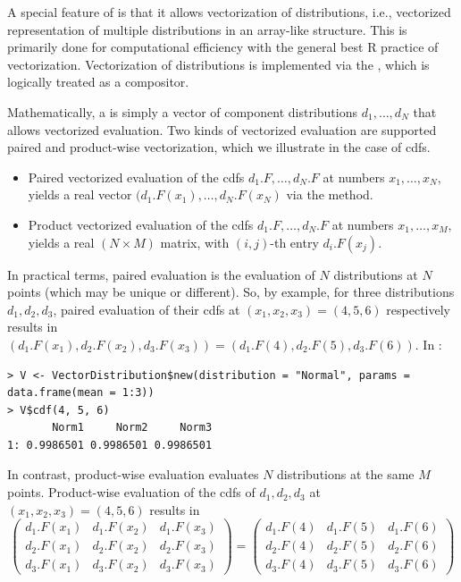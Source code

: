 A special feature of  is that it allows vectorization of distributions,  i.e., vectorized representation of multiple distributions in an array-like structure. This is primarily done for computational efficiency with the general best R practice of vectorization. Vectorization of  distributions is implemented via the , which is logically treated as a compositor.

Mathematically, a  is simply a vector of component distributions $d_1,\dots, d_N$ that allows vectorized evaluation. Two kinds of vectorized evaluation are supported paired and product-wise vectorization, which we illustrate in the case of cdfs.
\begin{itemize}
\itemsep-0.2em
\item Paired vectorized evaluation of the cdfs $d_1.F,\dots, d_N.F$ at numbers $x_1,\dots, x_N,$ yields a real vector $(d_1.F(x_1),\dots, d_N.F(x_N)$ via the  method.
\item Product vectorized evaluation of the cdfs $d_1.F,\dots, d_N.F$ at numbers $x_1,\dots, x_M,$ yields a real $(N\times M)$ matrix, with $(i,j)$-th entry $d_i.F(x_j)$.
\end{itemize}

In practical terms, paired evaluation is the evaluation of $N$ distributions at $N$ points (which may be unique or different). So, by example, for three distributions $d_1,d_2,d_3$, paired evaluation of their cdfs at $(x_1, x_2, x_3) = (4,5,6)$ respectively results in $(d_1.F(x_1), d_2.F(x_2), d_3.F(x_3)) = (d_1.F(4), d_2.F(5), d_3.F(6))$. In :
\begin{verbatim}
> V <- VectorDistribution$new(distribution = "Normal", params = data.frame(mean = 1:3))
> V$cdf(4, 5, 6)
       Norm1     Norm2     Norm3
1: 0.9986501 0.9986501 0.9986501
\end{verbatim}

In contrast, product-wise evaluation evaluates $N$ distributions at the same $M$ points. Product-wise evaluation of the cdfs of $d_1,d_2,d_3$ at $(x_1, x_2, x_3) = (4,5,6)$ results in
\begin{equation*}
\begin{pmatrix}
d_1.F(x_1) & d_1.F(x_2) & d_1.F(x_3) \\
d_2.F(x_1) & d_2.F(x_2) & d_2.F(x_3) \\
d_3.F(x_1) & d_3.F(x_2) & d_3.F(x_3)
\end{pmatrix} =
\begin{pmatrix}
d_1.F(4) & d_1.F(5) & d_1.F(6) \\
d_2.F(4) & d_2.F(5) & d_2.F(6) \\
d_3.F(4) & d_3.F(5) & d_3.F(6)
\end{pmatrix}
\end{equation*}

